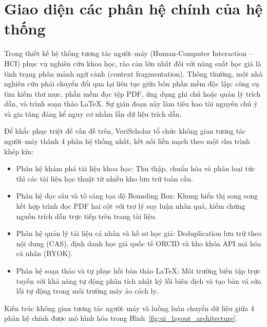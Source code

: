 \section{Giao diện các phân hệ chính của hệ thống}
\label{sec:giao_dien_phan_he}

Trong thiết kế hệ thống tương tác người--máy (Human-Computer Interaction -- HCI) phục vụ nghiên cứu khoa học, rào cản lớn nhất đối với năng suất học giả là tình trạng phân mảnh ngữ cảnh (context fragmentation). Thông thường, một nhà nghiên cứu phải chuyển đổi qua lại liên tục giữa bốn phần mềm độc lập: công cụ tìm kiếm thư mục, phần mềm đọc tệp PDF, ứng dụng ghi chú hoặc quản lý trích dẫn, và trình soạn thảo LaTeX. Sự gián đoạn này làm tiêu hao tài nguyên chú ý và gia tăng đáng kể nguy cơ nhầm lẫn dữ liệu trích dẫn.

Để khắc phục triệt để vấn đề trên, VeriScholar tổ chức không gian tương tác người--máy thành 4 phân hệ thống nhất, kết nối liền mạch theo một chu trình khép kín:
\begin{itemize}[noitemsep, topsep=1pt]
    \item Phân hệ khám phá tài liệu khoa học: Thu thập, chuẩn hóa và phân loại tức thì các tài liệu học thuật từ nhiều kho lưu trữ toàn cầu.
    \item Phân hệ đọc sâu và tô sáng tọa độ Bounding Box: Khung hiển thị song song kết hợp trình đọc PDF hai cột với trợ lý suy luận nhân quả, kiểm chứng nguồn trích dẫn trực tiếp trên trang tài liệu.
    \item Phân hệ quản lý tài liệu cá nhân và hồ sơ học giả: Deduplication lưu trữ theo nội dung (CAS), định danh học giả quốc tế ORCID và kho khóa API mã hóa cá nhân (BYOK).
    \item Phân hệ soạn thảo và tự phục hồi bản thảo LaTeX: Môi trường biên tập trực tuyến với khả năng tự động phân tích nhật ký lỗi biên dịch và tạo bản vá sửa lỗi tự động trong môi trường máy ảo cách ly.
\end{itemize}

Kiến trúc không gian tương tác người--máy và luồng luân chuyển dữ liệu giữa 4 phân hệ chính được mô hình hóa trong Hình~\ref{fig:ui_layout_architecture}.

